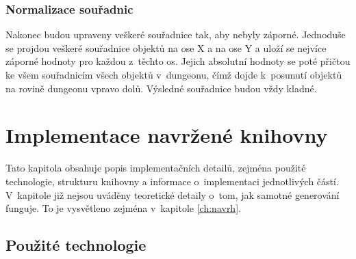 
\subsection{Normalizace souřadnic}


Nakonec budou upraveny veškeré souřadnice tak, aby nebyly záporné.
Jednoduše se projdou veškeré souřadnice objektů na ose X a na ose Y a uloží se nejvíce záporné hodnoty pro každou z~těchto os.
Jejich absolutní hodnoty se poté přičtou ke všem souřadnicím všech objektů v~dungeonu, čímž dojde k~posunutí objektů na rovině dungeonu vpravo dolů.
Výsledné souřadnice budou vždy kladné.


\chapter{Implementace navržené knihovny}
\label{ch:implementace} %


Tato kapitola obsahuje popis implementačních detailů, zejména použité technologie, strukturu knihovny a informace o~implementaci jednotlivých částí.
V~kapitole již nejsou uváděny teoretické detaily o~tom, jak samotné generování funguje.
To je vysvětleno zejména v~kapitole \ref{ch:navrh}.


\section{Použité technologie}


